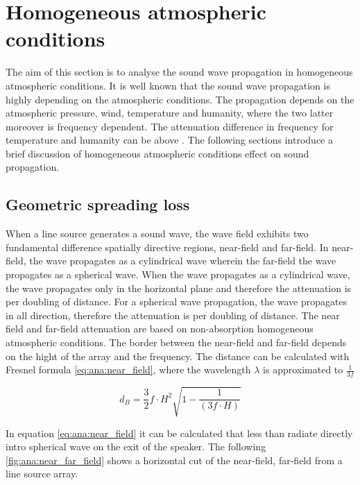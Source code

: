 \section{Homogeneous atmospheric conditions}\label{sec:ana:hom_ats_con}
The aim of this section is to analyse the sound wave propagation in homogeneous atmospheric conditions. It is well known that the sound wave propagation is highly depending on the atmospheric conditions. The propagation depends on the atmospheric pressure, wind, temperature and humanity, where the two latter moreover is frequency dependent. The attenuation difference in frequency for temperature and humanity can be above  \citep{corteel2017large}. The following sections introduce a brief discussion of homogeneous atmospheric conditions effect on sound propagation.

\subsection{Geometric spreading loss}
When a line source generates a sound wave, the wave field exhibits two fundamental difference spatially directive regions, near-field and far-field. In near-field, the wave propagates as a cylindrical wave wherein the far-field the wave propagates as a spherical wave. When the wave propagates as a cylindrical wave, the wave propagates only in the horizontal plane and therefore the attenuation is  per doubling of distance. For a spherical wave propagation, the wave propagates in all direction, therefore the attenuation is  per doubling of distance. The near field and far-field attenuation are based on non-absorption homogeneous atmospheric conditions. The border between the near-field and far-field depends on the hight of the array and the frequency. The distance can be calculated with Fresnel formula \autoref{eq:ana:near_field}, where the wavelength $\lambda$ is approximated to $\frac{1}{3f}$ \citep{bauman2001wavefront}

\begin{equation}\label{eq:ana:near_field}
d_{B} = \frac{3}{2}f \cdot H^{2}\sqrt{1-\frac{1}{(3f \cdot H)}}
\end{equation}

\startexplain
{}
\stopexplain

In equation \autoref{eq:ana:near_field} it can be calculated that less than  radiate directly intro spherical wave on the exit of the speaker. The following \autoref{fig:ana:near_far_field} shows a horizontal cut of the near-field, far-field from a line source array. 

